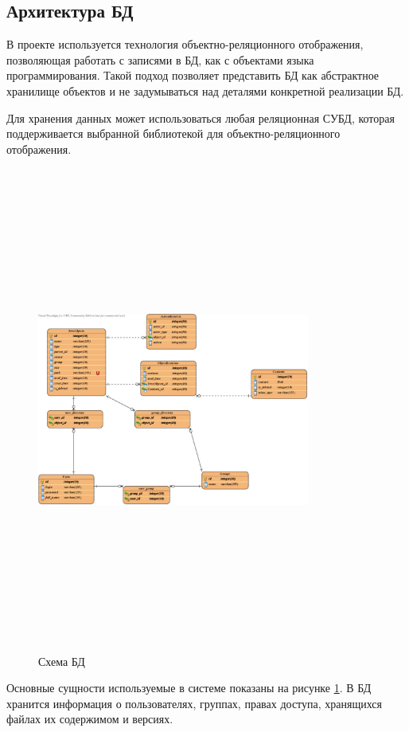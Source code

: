\documentclass[utf8,usehyperref,12pt]{G7-32}
\begin{document}
 
\subsection{Архитектура БД}

В проекте используется технология объектно-реляционного отображения, позволяющая работать с записями в БД, как с объектами языка программирования. Такой подход позволяет представить БД как абстрактное хранилище объектов и не задумываться над деталями конкретной реализации БД.

Для хранения данных может использоваться любая реляционная СУБД, которая поддерживается выбранной библиотекой для объектно-реляционного отображения.

\begin{figure}[ht]
   \centering%
   \includegraphics[height=160mm, width=0.8\textwidth, clip, keepaspectratio]{pictures/DB}
   \caption{Схема БД}\label{fig:db_scheme}
 \end{figure}

Основные сущности используемые в системе показаны на рисунке \ref{fig:db_scheme}. В БД хранится информация о пользователях, группах, правах доступа, хранящихся файлах их содержимом и версиях.
\end{document}
